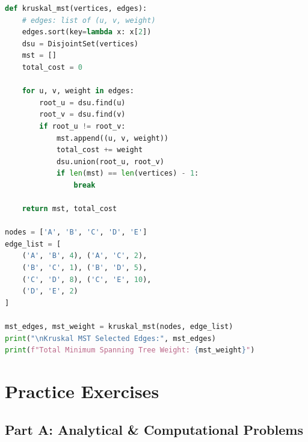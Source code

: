 \begin{lstlisting}[language=Python, caption=Dijkstra Shortest Paths and Kruskal MST Implementation]
def kruskal_mst(vertices, edges):
    # edges: list of (u, v, weight)
    edges.sort(key=lambda x: x[2])
    dsu = DisjointSet(vertices)
    mst = []
    total_cost = 0
    
    for u, v, weight in edges:
        root_u = dsu.find(u)
        root_v = dsu.find(v)
        if root_u != root_v:
            mst.append((u, v, weight))
            total_cost += weight
            dsu.union(root_u, root_v)
            if len(mst) == len(vertices) - 1:
                break
                
    return mst, total_cost

nodes = ['A', 'B', 'C', 'D', 'E']
edge_list = [
    ('A', 'B', 4), ('A', 'C', 2),
    ('B', 'C', 1), ('B', 'D', 5),
    ('C', 'D', 8), ('C', 'E', 10),
    ('D', 'E', 2)
]

mst_edges, mst_weight = kruskal_mst(nodes, edge_list)
print("\nKruskal MST Selected Edges:", mst_edges)
print(f"Total Minimum Spanning Tree Weight: {mst_weight}")
\end{lstlisting}

\newpage
\section{Practice Exercises}

\subsection*{Part A: Analytical \& Computational Problems}

